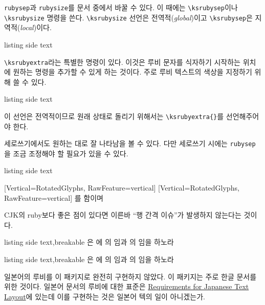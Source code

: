 \documentclass[a4paper]{oblivoir}
\def\pkg#1{\textsf{#1}}
\begin{document}
\numpar
\verb|rubysep|과 \verb|rubysize|를 문서 중에서 바꿀 수 있다. 이 때에는 \verb|\ksrubysep|이나 \verb|\ksrubysize| 명령을 쓴다. \verb|\ksrubysize| 선언은 전역적(\emph{global})이고
\verb|\ksrubysep|은 지역적(\emph{local})이다.
\begin{tcblisting}{listing side text}
{\ksrubysep{5pt}   }
\end{tcblisting}

\numpar 
{}
\verb|\ksrubyextra|라는 특별한 명령이 있다. 이것은 루비 문자를 식자하기 시작하는 위치에 원하는 명령을 추가할 수 있게 하는 것이다. 주로 루비 텍스트의 색상을 지정하기 위해 쓸 수 있다. 
\begin{tcblisting}{listing side text}
\ksrubyextra{\color{red}}
\end{tcblisting}
이 선언은 전역적이므로 원래 상태로 돌리기 위해서는 \verb|\ksrubyextra{}|를 선언해주어야 한다.

\numpar 
세로쓰기에서도 원하는 대로 잘 나타남을 볼 수 있다. 다만 세로쓰기 시에는 \verb|rubysep|을 조금 조정해야
할 필요가 있을 수 있다.
\begin{tcblisting}{listing side text}
\begin{vertical}{10em}
%
   [Vertical=RotatedGlyphs,%
    RawFeature=vertical]
%
   [Vertical=RotatedGlyphs,%
    RawFeature=vertical]
\ksrubysep{-2pt}
를 함이며
\end{vertical}
\end{tcblisting}

\numpar 
CJK의 \pkg{ruby}보다 좋은 점이 있다면 이른바 ``행 간격 이슈''가 발생하지 않는다는 것이다. 
\begin{tcblisting}{listing side text,breakable}
은 에  의 임과 의 임을 하노라 
\end{tcblisting}
\begin{tcblisting}{listing side text,breakable}
\linespread{2.5}
은 에  의 임과 의 임을 하노라 
\end{tcblisting}


\numpar
일본어의 루비를 이 패키지로 완전히 구현하지 않았다. 이 패키지는 주로 한글 문서를 위한 것이다. 
일본어 문서의 루비에 대한 표준은 \href{https://www.w3.org/TR/jlreq/#ruby_and_emphasis_dots}{Requirements for Japanese Text Layout}에 있는데 이를 구현하는 것은 일본어 텍의 일이 아니겠는가.
\end{document}
